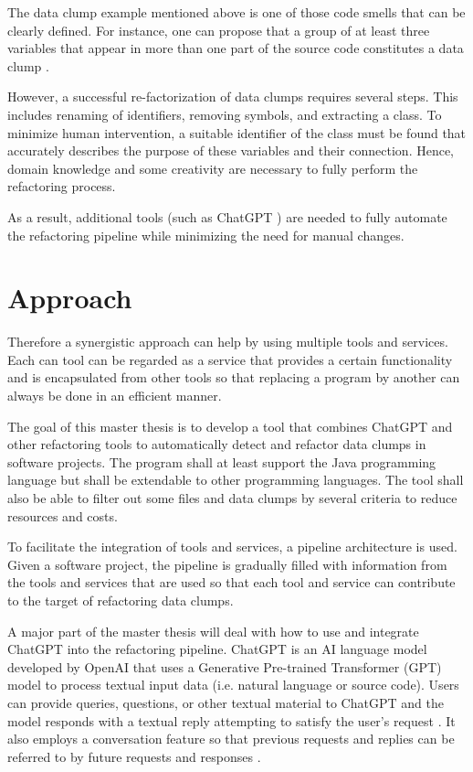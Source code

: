 The data clump example mentioned above is one of those code smells that can be clearly defined. For instance, one can propose that a group of at least three variables that appear in more than one part of the source code constitutes a data clump \cite{zhangImprovingPrecisionFowler2008}.


However, a successful re-factorization of data clumps requires several steps. This includes renaming of identifiers, removing symbols, and extracting a class. To minimize human intervention, a suitable identifier of the class must be found that accurately describes the purpose of these variables and their connection. Hence, domain knowledge and some creativity are necessary to fully perform the refactoring process.

As a result,  additional tools (such as ChatGPT \cite{ChatGPT_url}) are needed to fully automate the refactoring pipeline while minimizing the need for manual changes. 




\section{Approach}
Therefore a synergistic approach can help by using multiple tools and services.  Each can tool can be regarded as  a service that provides a certain functionality and is encapsulated from other tools so that replacing a program by another can always be done in an efficient manner. 


The goal of this master thesis is to develop a tool that  combines ChatGPT and other refactoring tools  to automatically detect and refactor data clumps in software projects. The program  shall at least support the Java programming language but shall be extendable to  other programming languages. The tool shall also  be able to filter out some files and data clumps by several criteria to reduce resources and costs. 




To facilitate the integration of tools and services, a pipeline architecture is used. Given a software project, the pipeline is gradually filled with information from the tools and services that are used so that each tool and service can contribute to the target of refactoring data clumps.

A major part of the master thesis will deal with how to use and integrate ChatGPT into the refactoring pipeline. 
ChatGPT is an AI language model developed by OpenAI that uses a Generative Pre-trained Transformer (GPT) model to process textual input data (i.e. natural language or source code). Users can provide queries, questions, or other textual material to ChatGPT and the model responds with a textual reply attempting to satisfy the user's request \cite{yetistirenEvaluatingCodeQuality2023}. It also employs a conversation feature so that previous requests and replies can be referred to by future requests and responses \cite{sobania2023analysis}.

